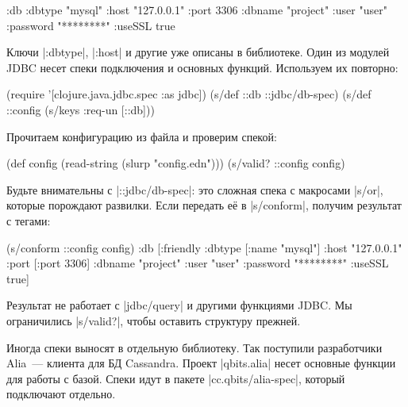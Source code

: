
\begin{english}
  \begin{clojure}
{:db {:dbtype "mysql"
      :host "127.0.0.1"
      :port 3306
      :dbname "project"
      :user "user"
      :password "********"
      :useSSL true}}
  \end{clojure}
\end{english}

Ключи \spverb|:dbtype|, \spverb|:host| и другие уже описаны в библиотеке. Один
из модулей JDBC несет спеки подключения и основных функций. Используем их
повторно:

\begin{english}
  \begin{clojure}
(require '[clojure.java.jdbc.spec :as jdbc])
(s/def ::db ::jdbc/db-spec)
(s/def ::config (s/keys :req-un [::db]))
  \end{clojure}
\end{english}

\noindent
Прочитаем конфигурацию из файла и проверим спекой:

\begin{english}
  \begin{clojure}
(def config (read-string (slurp "config.edn")))
(s/valid? ::config config)
  \end{clojure}
\end{english}

\label{jdbc-conform-warning}


Будьте внимательны с \spverb|::jdbc/db-spec|: это сложная спека с макросами
\spverb|s/or|, которые порождают развилки. Если передать е\"{е} в
\spverb|s/conform|, получим результат с тегами:

\begin{english}
  \begin{clojure}
(s/conform ::config config)
{:db
 [:friendly
  {:dbtype   [:name "mysql"]
   :host     "127.0.0.1"
   :port     [:port 3306]
   :dbname   "project"
   :user     "user"
   :password "********"
   :useSSL   true}]}
  \end{clojure}
\end{english}

Результат не работает с \spverb|jdbc/query| и другими функциями JDBC. Мы
ограничились \spverb|s/valid?|, чтобы оставить структуру прежней.


Иногда спеки выносят в отдельную библиотеку. Так поступили разработчики
Alia~--- клиента для БД
Cassandra. Проект \spverb|qbits.alia| несет основные функции для работы с
базой. Спеки идут в пакете \spverb|cc.qbits/alia-spec|, который подключают
отдельно.

